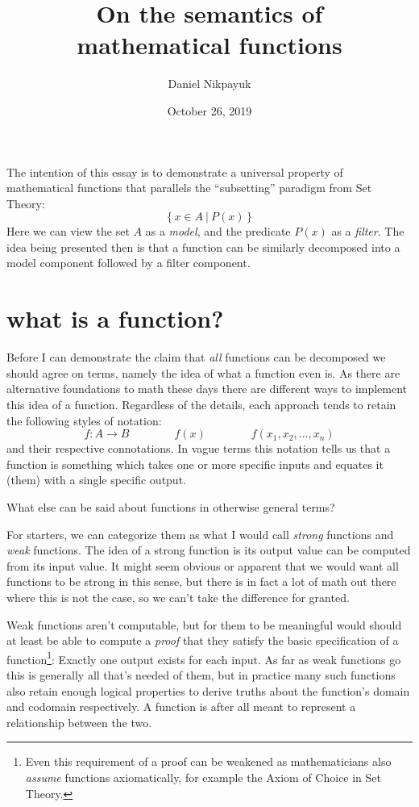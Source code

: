 \documentclass[twoside]{article}
\title{On the semantics of\\mathematical functions}
\author{Daniel Nikpayuk}
\date{October 26, 2019}
\begin{document}
\maketitle
\thispagestyle{empty}

The intention of this essay is to demonstrate a universal property of mathematical functions
that parallels the ``subsetting'' paradigm from Set Theory:
$$ \{\,x\in A\ |\ P(x)\,\} $$
Here we can view the set $ A $ as a \emph{model}, and the predicate $ P(x) $ as a \emph{filter}. The idea being
presented then is that a function can be similarly decomposed into a model component followed by a filter component.

\section*{what is a function?}

Before I can demonstrate the claim that \emph{all} functions can be decomposed we should agree on terms, namely the idea
of what a function even is. As there are alternative foundations to math these days there are different ways to implement
this idea of a function. Regardless of the details, each approach tends to retain the following styles of notation:
$$ f:A\to B \qquad\qquad f(x) \qquad\qquad f(x_1,x_2,\ldots,x_n) $$
and their respective connotations. In vague terms this notation tells us that a function is something which takes
one or more specific inputs and equates it (them) with a single specific output.

What else can be said about functions in otherwise general terms?

For starters, we can categorize them as what I would call \emph{strong} functions and \emph{weak} functions.
The idea of a strong function is its output value can be computed from its input value. It might seem obvious
or apparent that we would want all functions to be strong in this sense, but there is in fact a lot of math
out there where this is not the case, so we can't take the difference for granted.

Weak functions aren't computable, but for them to be meaningful would should at least be able to compute a \emph{proof}
that they satisfy the basic specification of a function\footnote{Even this requirement of a proof can be weakened
as mathematicians also \emph{assume} functions axiomatically, for example the Axiom of Choice in Set Theory.}:
Exactly one output exists for each input. As far as weak functions go this is generally all that's needed of them,
but in practice many such functions also retain enough logical properties to derive truths about the function's
domain and codomain respectively. A function is after all meant to represent a relationship between the two.
\end{document}
